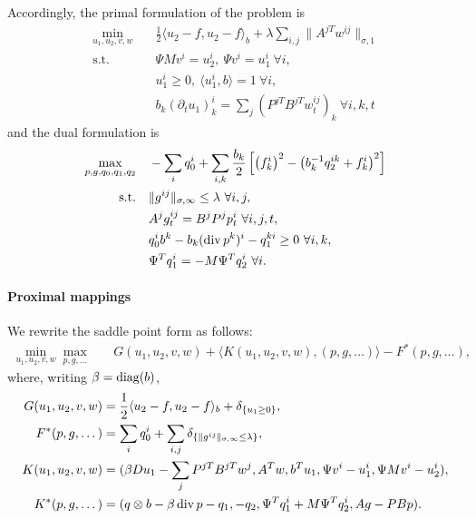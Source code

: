 Accordingly, the primal formulation of the problem is
\begin{align*}
    \min_{u_1,u_2,v,w} \quad
        & \frac{1}{2} \langle u_2 - f, u_2 - f \rangle_b 
            + \lambda \sum_{i,j} \| A^{jT} w^{ij} \|_{\sigma,1} \\
    \text{s.t.}\quad 
        & \Psi M v^i = u_2^i, ~\Psi v^i = u_1^i ~\forall i, \\
        & u_1^i \geq 0, ~\langle u_1^i, b \rangle = 1 ~\forall i, \\
        & b_k (\partial_t u_1)_k^i = \sum_j (P^{jT}B^{jT}w^{ij}_t)_{k} ~\forall i,k,t
\end{align*}
and the dual formulation is
\begin{align*}
    \max_{p,g,q_0,q_1,q_2} \quad
        & -\sum_i q_0^i+ \sum_{i,k} \frac{b_k}{2} \left [
                \left(f_k^i\right)^2
                - \left(b_k^{-1} q_2^{ik} + f_k^i\right)^2
            \right ] \\
    \text{s.t.}\quad 
        & \|g^{ij}\|_{\sigma,\infty} \leq \lambda ~\forall i,j, \\
        & A^j g^{ij}_t = B^j P^j p^i_t ~\forall i,j,t, \\
        & q_0^i b^k - b_k (\operatorname{div} p^k)^i - q_1^{ki} \geq 0 ~\forall i, k, \\
        & \Psi^T q_1^i = -M \Psi^T q_2^i ~\forall i.
\end{align*}

\paragraph{Proximal mappings}

We rewrite the saddle point form as follows:
\begin{align*}
    \min_{u_1,u_2,v,w} \max_{p,g,\dots} \quad
        & G(u_1,u_2,v,w) + \langle K(u_1,u_2,v,w), (p,g,\dots) \rangle - F^*(p,g,\dots),
\end{align*}
where, writing $\beta = \operatorname{diag}(b)$,
\begin{align*}
    G(u_1,u_2,v,w) &= \frac{1}{2} \langle u_2-f, u_2-f \rangle_b
        + \delta_{\{u_1 \geq 0\}}, \\
    F^*(p,g,\dots) &= \sum_{i} q_0^i 
        + \sum_{i,j} \delta_{\{\|g^{ij}\|_{\sigma,\infty} \leq \lambda\}}, \\
    K(u_1,u_2,v,w) &= (
        \beta Du_1 - \sum_j P^{jT}B^{jT}w^{j},
        A^T w,
        b^T u_1,
        \Psi v^i - u_1^i,
        \Psi M v^i - u_2^i
    ), \\
    K^*(p,g,\dots) &= (
        q \otimes b - \beta \operatorname{div}{p} - q_1,
        -q_2,
        \Psi^T q_1^i + M \Psi^T q_2^i,
        A g - PBp
    ).
\end{align*}

